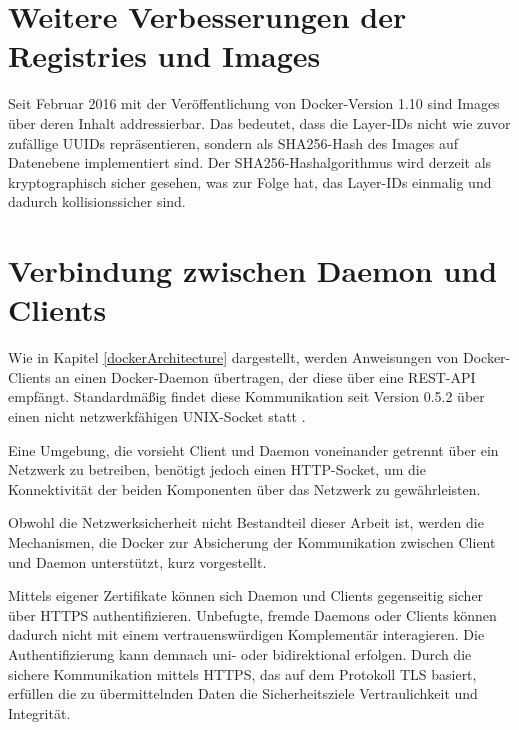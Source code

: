 \documentclass[../main.tex]{subfiles}
\begin{document}
  \section{Weitere Verbesserungen der Registries und Images}
    Seit Februar 2016 mit der Veröffentlichung von Docker-Version 1.10 sind Images über deren Inhalt addressierbar. Das bedeutet, dass die Layer-IDs nicht wie zuvor zufällige UUIDs repräsentieren, sondern als SHA256-Hash des Images auf Datenebene implementiert sind. Der SHA256-Hashalgorithmus wird derzeit als kryptographisch sicher gesehen, was zur Folge hat, das Layer-IDs einmalig und dadurch kollisionssicher sind.




  \section{Verbindung zwischen Daemon und Clients}
  \label{conClientServer}
    Wie in Kapitel \ref{dockerArchitecture} dargestellt, werden Anweisungen von Docker-Clients an einen Docker-Daemon übertragen, der diese über eine REST-API empfängt. Standardmäßig findet diese Kommunikation seit Version 0.5.2 über einen nicht netzwerkfähigen UNIX-Socket statt \cite{dockerSecurity}.

    Eine Umgebung, die vorsieht Client und Daemon voneinander getrennt über ein Netzwerk zu betreiben, benötigt jedoch einen HTTP-Socket, um die Konnektivität der beiden Komponenten über das Netzwerk zu gewährleisten.

    Obwohl die Netzwerksicherheit nicht Bestandteil dieser Arbeit ist, werden die Mechanismen, die Docker zur Absicherung der Kommunikation zwischen Client und Daemon unterstützt, kurz vorgestellt.

    Mittels eigener Zertifikate können sich Daemon und Clients gegenseitig sicher über HTTPS authentifizieren. Unbefugte, fremde Daemons oder Clients können dadurch nicht mit einem vertrauenswürdigen Komplementär interagieren. Die Authentifizierung kann demnach uni- oder bidirektional erfolgen. Durch die sichere Kommunikation mittels HTTPS, das auf dem Protokoll TLS basiert, erfüllen die zu übermittelnden Daten die Sicherheitsziele Vertraulichkeit und Integrität.
\end{document}
